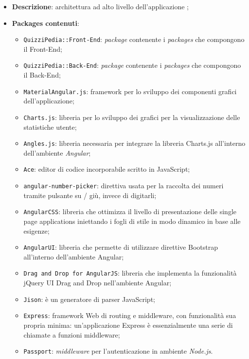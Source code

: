 \begin{itemize}
	\item \textbf{Descrizione}: architettura ad alto livello dell'applicazione \progetto;
	\item \textbf{Packages contenuti}:
	\begin{itemize}
		\item \texttt{QuizziPedia::Front-End}: \textit{package} contenente i \textit{packages} che compongono il Front-End;
		\item \texttt{QuizziPedia::Back-End}: \textit{package} contenente i \textit{packages} che compongono il Back-End;
		\item \texttt{MaterialAngular.js}: framework per lo sviluppo dei componenti grafici dell'applicazione;
		\item \texttt{Charts.js}: libreria per lo sviluppo dei grafici per la visualizzazione delle statistiche utente;
		\item \texttt{Angles.js}: libreria necessaria per integrare la libreria Charts.js all'interno dell'ambiente \textit{Angular};
		\item \texttt{Ace}: editor di codice incorporabile scritto in JavaScript;
		\item
		\texttt{angular-number-picker}: direttiva usata per la raccolta dei numeri tramite pulsante su / giù, invece di digitarli;
		\item
		\texttt{AngularCSS}: libreria che ottimizza il livello di presentazione delle single page applications iniettando i fogli di stile in modo dinamico in base alle esigenze;
		\item 
		\texttt{AngularUI}: libreria che permette di utilizzare direttive Bootstrap all'interno dell'ambiente Angular;
		\item
		\texttt{Drag and Drop for AngularJS}: libreria che implementa la funzionalità jQuery UI Drag and Drop nell'ambiente Angular;
		\item \texttt{Jison}: è un generatore di parser JavaScript;
		\item \texttt{Express}: framework Web di routing e middleware, con funzionalità sua propria minima: un’applicazione Express è essenzialmente una serie di chiamate a funzioni middleware;
		\item \texttt{Passport}: \textit{middleware} per l'autenticazione in ambiente \textit{Node.js}.
	\end{itemize}
\end{itemize}
